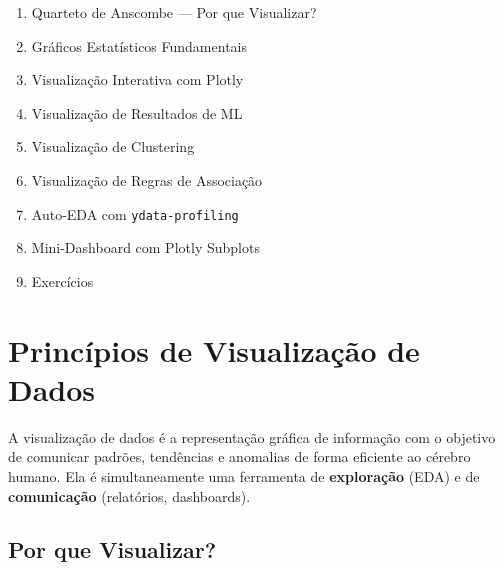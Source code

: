 \documentclass[12pt,a4paper]{article}
\begin{document}
\begin{enumerate}[label=\textbf{\arabic*.}, leftmargin=1.5cm, itemsep=0.2em]
  \item Quarteto de Anscombe --- Por que Visualizar?
  \item Gráficos Estatísticos Fundamentais
  \item Visualização Interativa com Plotly
  \item Visualização de Resultados de ML
  \item Visualização de Clustering
  \item Visualização de Regras de Associação
  \item Auto-EDA com \texttt{ydata-profiling}
  \item Mini-Dashboard com Plotly Subplots
  \item Exercícios
\end{enumerate}

\section{Princípios de Visualização de Dados}

A visualização de dados é a representação gráfica de informação com o objetivo de comunicar padrões, tendências e anomalias de forma eficiente ao cérebro humano. Ela é simultaneamente uma ferramenta de \textbf{exploração} (EDA) e de \textbf{comunicação} (relatórios, dashboards).

\subsection{Por que Visualizar?}
\end{document}
